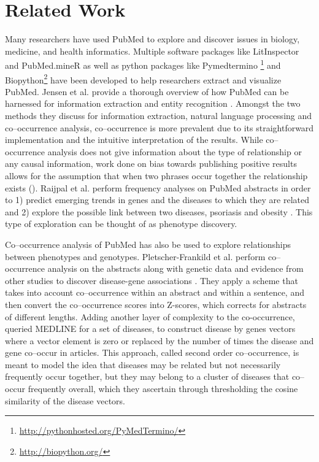 \documentclass{sig-alternate-05-2015}
\begin{document}
\section{Related Work}
Many researchers have used PubMed to explore and discover issues in biology, medicine, and health informatics.
Multiple software packages like LitInspector \cite{frisch2009litinspector} and PubMed.mineR as well as python packages like Pymedtermino \footnote{\url{http://pythonhosted.org/PyMedTermino/}} and Biopython\footnote{\url{http://biopython.org/}} have been developed to help researchers extract and visualize PubMed.
Jensen et al. provide a thorough overview of how PubMed can be harnessed for information extraction and entity recognition \cite{jensen2006literature}.
Amongst the two methods they discuss for information extraction, natural language processing and co--occurrence analysis, co--occurrence is more prevalent due to its straightforward implementation and the intuitive interpretation of the results.
While co--occurrence analysis does not give information about the type of relationship or any causal information, work done on bias towards publishing positive results allows for the assumption that when two phrases occur together the relationship exists (\cite{dickersin1990existence,easterbrook1991publication,stern1997publication}).
Raijpal et al. perform frequency analyses on PubMed abstracts in order to 1) predict emerging trends in genes and the diseases to which they are related and 2) explore the possible link between two diseases, psoriasis and obesity \cite{rajpal2014mining}. 
This type of exploration can be thought of as phenotype discovery.

Co--occurrence analysis of PubMed has also be used to explore relationships between phenotypes and genotypes.
Pletscher-Frankild et al. perform co--occurrence analysis on the abstracts along with genetic data and evidence from other studies to discover disease-gene associations \cite{pletscher2015diseases}.
They apply a scheme that takes into account co--occurrence within an abstract and within a sentence, and then convert the co--occurrence scores into Z-scores, which corrects for abstracts of different lengths.
Adding another layer of complexity to the co-occurrence, \cite{von2015data} queried MEDLINE for a set of diseases, to construct disease by genes vectors where a vector element is zero or replaced by the number of times the disease and gene co--occur in articles. 
This approach, called second order co--occurrence, is meant to model the idea that diseases may be related but not necessarily frequently occur together, but they may belong to a cluster of diseases that co--occur frequently overall, which they ascertain through thresholding the cosine similarity of the disease vectors.
\end{document}

